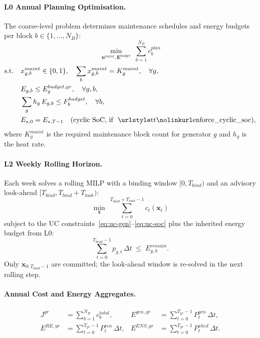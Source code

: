 \paragraph{L0 Annual Planning Optimisation.}
The coarse-level problem determines maintenance schedules and energy budgets
per block $b \in \{1,\ldots,N_B\}$:
\begin{equation}
  \min_{\mathbf{u}^{maint},\mathbf{E}^{budget}} \;
    \sum_{b=1}^{N_B} c_b^{plan}
    \label{eq:l0-obj}
\end{equation}
\begin{align}
  \text{s.t.} \quad &
    x_{g,b}^{maint} \in \{0,1\},
    \quad \sum_b x_{g,b}^{maint} = K_g^{maint}, \quad \forall g,
    \label{eq:l0-maint}\\
    &E_{g,b} \leq E_g^{budget,yr}, \quad \forall g,b,
    \label{eq:l0-energy}\\
    &\sum_g h_g\,E_{g,b} \leq F_b^{budget}, \quad \forall b,
    \label{eq:l0-fuel}\\
    &E_{s,0} = E_{s,T-1} \quad \text{(cyclic SoC, if \texttt{enforce\_cyclic\_soc})},
    \label{eq:cyclic-soc}
\end{align}
where $K_g^{maint}$ is the required maintenance block count for generator $g$
and $h_g$ is the heat rate.

\paragraph{L2 Weekly Rolling Horizon.}
Each week solves a rolling MILP with a binding window $[0, T_{bind})$ and
an advisory look-ahead $[T_{bind}, T_{bind}+T_{look})$:
\begin{equation}
  \min_{\mathbf{x}} \;
  \sum_{t=0}^{T_{bind}+T_{look}-1} c_t(\mathbf{x}_t)
  \label{eq:l2-obj}
\end{equation}
subject to the UC constraints~\eqref{eq:uc-gen}--\eqref{eq:uc-soc} plus the
inherited energy budget from L0:
\begin{equation}
  \sum_{t=0}^{T_{bind}-1} p_{g,t}\,\Delta t \;\leq\; E_{g,b}^{remain}.
  \label{eq:l2-budget}
\end{equation}
Only $\mathbf{x}_{0:T_{bind}-1}$ are committed; the look-ahead window is
re-solved in the next rolling step.

\paragraph{Annual Cost and Energy Aggregates.}
\begin{align}
  J^{yr}     &= \sum_{b=1}^{N_B} c_b^{total}, &
  E^{gen,yr} &= \sum_{t=0}^{T_{yr}-1} P_t^{gen}\,\Delta t,\\
  E^{RE,yr}  &= \sum_{t=0}^{T_{yr}-1} P_t^{ren}\,\Delta t, &
  E^{ENS,yr} &= \sum_{t=0}^{T_{yr}-1} P_t^{shed}\,\Delta t.
\end{align}

